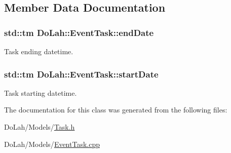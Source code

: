 \subsection{Member Data Documentation}
\hypertarget{class_do_lah_1_1_event_task_ae9696ae87dadd2de4f76e5ea13426287}{}
\subsubsection[{end\+Date}]{\setlength{\rightskip}{0pt plus 5cm}std\+::tm Do\+Lah\+::\+Event\+Task\+::end\+Date\hspace{0.3cm}{\ttfamily [private]}}\label{class_do_lah_1_1_event_task_ae9696ae87dadd2de4f76e5ea13426287}


Task ending datetime. 

\hypertarget{class_do_lah_1_1_event_task_a8d25a18b1f161b343e48b247f943ed6c}{}
\subsubsection[{start\+Date}]{\setlength{\rightskip}{0pt plus 5cm}std\+::tm Do\+Lah\+::\+Event\+Task\+::start\+Date\hspace{0.3cm}{\ttfamily [private]}}\label{class_do_lah_1_1_event_task_a8d25a18b1f161b343e48b247f943ed6c}


Task starting datetime. 



The documentation for this class was generated from the following files\+:\begin{DoxyCompactItemize}
\item 
Do\+Lah/\+Models/\hyperlink{_task_8h}{Task.\+h}\item 
Do\+Lah/\+Models/\hyperlink{_event_task_8cpp}{Event\+Task.\+cpp}\end{DoxyCompactItemize}
